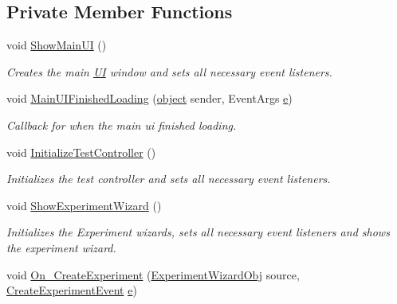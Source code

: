 \subsection*{Private Member Functions}
\begin{DoxyCompactItemize}
\item 
void \hyperlink{class_web_analyzer_1_1_controller_1_1_main_controller_aa87735ea9e190ab3221160fe4d232833}{Show\+Main\+U\+I} ()
\begin{DoxyCompactList}\small\item\em Creates the main \hyperlink{namespace_web_analyzer_1_1_u_i}{U\+I} window and sets all necessary event listeners. \end{DoxyCompactList}\item 
void \hyperlink{class_web_analyzer_1_1_controller_1_1_main_controller_aab65da07ca7ce15a5957e7f01e260b86}{Main\+U\+I\+Finished\+Loading} (\hyperlink{_u_i_2_h_t_m_l_resources_2js_2lib_2underscore_8min_8js_aae18b7515bb2bc4137586506e7c0c903}{object} sender, Event\+Args \hyperlink{_u_i_2_h_t_m_l_resources_2js_2lib_2bootstrap_8min_8js_ab5902775854a8b8440bcd25e0fe1c120}{e})
\begin{DoxyCompactList}\small\item\em Callback for when the main ui finished loading. \end{DoxyCompactList}\item 
void \hyperlink{class_web_analyzer_1_1_controller_1_1_main_controller_a547afe4ecfaa8fd487ee1665262374fe}{Initialize\+Test\+Controller} ()
\begin{DoxyCompactList}\small\item\em Initializes the test controller and sets all necessary event listeners. \end{DoxyCompactList}\item 
void \hyperlink{class_web_analyzer_1_1_controller_1_1_main_controller_affb20dd05516641ec46676704f9c4a75}{Show\+Experiment\+Wizard} ()
\begin{DoxyCompactList}\small\item\em Initializes the Experiment wizards, sets all necessary event listeners and shows the experiment wizard. \end{DoxyCompactList}\item 
void \hyperlink{class_web_analyzer_1_1_controller_1_1_main_controller_a128386d15417b0ae5e388f39d71c7535}{On\+\_\+\+Create\+Experiment} (\hyperlink{class_web_analyzer_1_1_u_i_1_1_interaction_objects_1_1_experiment_wizard_obj}{Experiment\+Wizard\+Obj} source, \hyperlink{class_web_analyzer_1_1_events_1_1_create_experiment_event}{Create\+Experiment\+Event} \hyperlink{_u_i_2_h_t_m_l_resources_2js_2lib_2bootstrap_8min_8js_ab5902775854a8b8440bcd25e0fe1c120}{e})

\end{DoxyCompactItemize}
